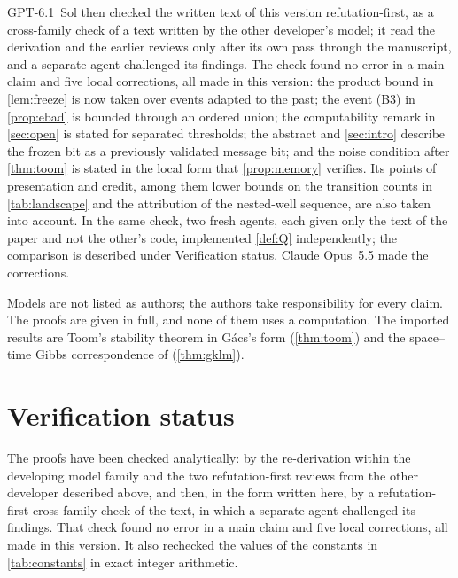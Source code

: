 \documentclass[11pt]{article}
\theoremstyle{plain}
\theoremstyle{definition}
\theoremstyle{remark}
\begin{document}
GPT-6.1~Sol then checked the written text of this version refutation-first, as a cross-family check of a text written by the other developer's model; it read the derivation and the earlier reviews only after its own pass through the manuscript, and a separate agent challenged its findings. The check found no error in a main claim and five local corrections, all made in this version: the product bound in \cref{lem:freeze} is now taken over events adapted to the past; the event (B3) in \cref{prop:ebad} is bounded through an ordered union; the computability remark in \cref{sec:open} is stated for separated thresholds; the abstract and \cref{sec:intro} describe the frozen bit as a previously validated message bit; and the noise condition after \cref{thm:toom} is stated in the local form that \cref{prop:memory} verifies. Its points of presentation and credit, among them lower bounds on the transition counts in \cref{tab:landscape} and the attribution of the nested-well sequence, are also taken into account. In the same check, two fresh agents, each given only the text of the paper and not the other's code, implemented \cref{def:Q} independently; the comparison is described under Verification status. Claude Opus~5.5 made the corrections.

Models are not listed as authors; the authors take responsibility for every claim. The proofs are given in full, and none of them uses a computation. The imported results are Toom's stability theorem in G\'acs's form (\cref{thm:toom}) and the space--time Gibbs correspondence of \cite{DMst} (\cref{thm:gklm}).

\section*{Verification status}

The proofs have been checked analytically: by the re-derivation within the developing model family and the two refutation-first reviews from the other developer described above, and then, in the form written here, by a refutation-first cross-family check of the text, in which a separate agent challenged its findings. That check found no error in a main claim and five local corrections, all made in this version. It also rechecked the values of the constants in \cref{tab:constants} in exact integer arithmetic.
\end{document}
